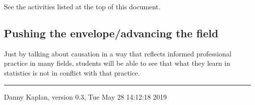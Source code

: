 \documentclass[nofonts,]{tufte-handout}
\begin{document}
See the activities listed at the top of this document.

\hypertarget{pushing-the-envelopeadvancing-the-field}{%
\subsection{Pushing the envelope/advancing the
field}\label{pushing-the-envelopeadvancing-the-field}}

Just by talking about causation in a way that reflects informed
professional practice in many fields, students will be able to see that
what they learn in statistics is not in conflict with that practice.

\begin{center}\rule{0.5\linewidth}{\linethickness}\end{center}

Danny Kaplan, version 0.3, Tue May 28 14:12:18 2019
\end{document}

